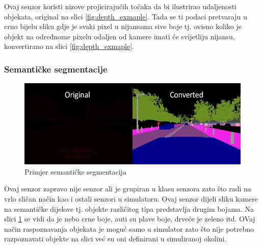 Ovaj senzor koristi nizove projicirajućih točaka da bi ilustrirao udaljenosti objekata, original na slici \ref{fig:depth_exmaple}. Tada se ti podaci pretvaraju u crno bijelu sliku gdje je svaki pixel u nijansama sive boje tj. ovisno koliko je objekt na određnome pixelu odaljen od kamere imati će svijetliju nijansu, konvertirano na slici \ref{fig:depth_exmaple}.

\newpage
\subsubsection{Semantičke segmentacije}
\begin{figure}[ht!]
  \centering
  \includegraphics[scale=0.5]{images/sem_seg_exmaple.png}
  \caption{Primjer semantičke segmentacija\cite{carla:sensors}}
  \label{fig:sem_seg_exmaple}
\end{figure}

Ovaj senzor zapravo nije senzor ali je grupiran u klasu senzora zato što radi na vrlo sličan način kao i ostali senzori u simulatoru. Ovaj senzor dijeli sliku kamere na semantičke dijelove tj. objekte različitog tipa predstavlja drugim bojama. Na slici \ref{fig:sem_seg_exmaple} se vidi da je nebo crne boje, auti su plave boje, drveće je zeleno itd. OVaj način raspoznavanja objekata je moguć samo u simulator zato što nije potrebno razpoznavati objekte na slici već su oni definirani u simuliranoj okolini.

